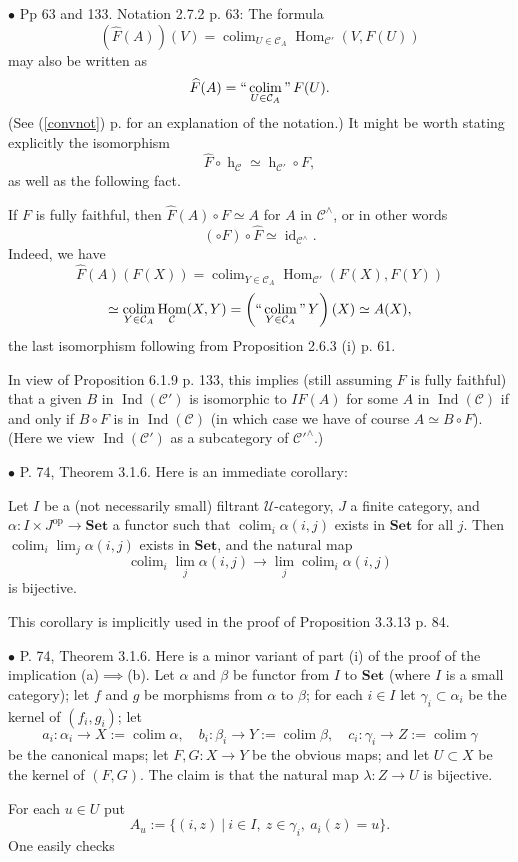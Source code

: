 \documentclass[12pt]{article}
\theoremstyle{remark}
\newcommand{\bu}{\bullet}
\newcommand{\n}{\noindent}
\newcommand{\C}{\mathcal C}
\newcommand{\U}{\mathcal U}
\newcommand{\Set}{\textbf{Set}}
\newcommand{\op}{\text{op}}
\newcommand{\cn}{(See (\ref{convnot}) p. \pageref{convnot} for an explanation of the notation.) }
\DeclareMathOperator*{\coli}{colim}
\DeclareMathOperator*{\icolim}{``\coli"}
\DeclareMathOperator{\hy}{h}
\DeclareMathOperator{\id}{id}
\DeclareMathOperator{\Hom}{Hom}
\DeclareMathOperator{\Ind}{Ind}
\begin{document}

\n$\bu$ Pp 63 and 133. Notation 2.7.2 p. 63: The formula 
$$
(\widehat F(A))(V)=\coli_{U\in\C_A}\Hom_{\C'}(V,F(U))
$$
may also be written as 
$$
\widehat F(A)=\icolim_{U\in\C_A}F(U).
$$
\cn It might be worth stating explicitly the isomorphism 
$$
\widehat F\circ\hy_\C\simeq\hy_{\C'}\circ F,
$$
as well as the following fact. 

If $F$ is fully faithful, then $\widehat F(A)\circ F\simeq A$ for $A$ in $\C^\wedge$, or in other words
$$
(\circ F)\circ\widehat F\simeq\id_{\C^\wedge}.
$$
Indeed, we have 
$$
\widehat F(A)(F(X))=\coli_{Y\in\C_A}\Hom_{\C'}(F(X),F(Y))
$$
$$
\simeq\coli_{Y\in\C_A}\Hom_\C(X,Y)
=\left(\icolim_{Y\in\C_A}Y\right)(X)
\simeq A(X),
$$
the last isomorphism following from Proposition 2.6.3 (i) p. 61. 

In view of Proposition 6.1.9 p. 133, this implies (still assuming $F$ is fully faithful) that a given $B$ in $\Ind(\C')$ is isomorphic to $IF(A)$ for some $A$ in $\Ind(\C)$ if and only if $B\circ F$ is in $\Ind(\C)$ (in which case we have of course $A\simeq B\circ F$). (Here we view $\Ind(\C')$ as a subcategory of $\C'^\wedge$.) 


\n$\bu$ P. 74, Theorem 3.1.6. Here is an immediate corollary: 

Let $I$ be a (not necessarily small) filtrant $\U$-category, $J$ a finite category, and $\alpha:I\times J^\op\to\Set$ a functor such that $\coli_i\alpha(i,j)$ exists in $\Set$ for all $j$. Then $\coli_i\lim_j\alpha(i,j)$ exists in $\Set$, and the natural map 
$$
\coli_i\lim_j\alpha(i,j)\to
\lim_j\coli_i\alpha(i,j)
$$ 
is bijective. 

This corollary is implicitly used in the proof of Proposition 3.3.13 p. 84. 


\n$\bu$ P. 74, Theorem 3.1.6. Here is a minor variant of part (i) of the proof of the implication (a)$\implies$(b). Let $\alpha$ and $\beta$ be functor from $I$ to $\Set$ (where $I$ is a small category); let $f$ and $g$ be morphisms from $\alpha$ to $\beta$; for each $i\in I$ let $\gamma_i\subset\alpha_i$ be the kernel of $(f_i,g_i)$; let 
$$
a_i:\alpha_i\to X:=\coli\alpha,\quad 
b_i:\beta_i\to Y:=\coli\beta,\quad 
c_i:\gamma_i\to Z:=\coli\gamma
$$ 
be the canonical maps; let $F,G:X\to Y$ be the obvious maps; and let $U\subset X$ be the kernel of $(F,G)$. The claim is that the natural map $\lambda:Z\to U$ is bijective. 

For each $u\in U$ put 
$$
A_u:=\{(i,z)\ |\ i\in I,\ z\in\gamma_i,\ a_i(z)=u\}.
$$ 
One easily checks 
\end{document}
